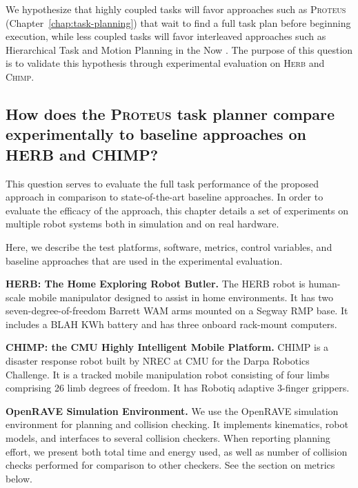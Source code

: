 {We hypothesize that highly coupled tasks will favor approaches
such as \textsc{Proteus} (Chapter~\ref{chap:task-planning})
that wait to find a full task plan
before beginning execution,
while less coupled tasks will favor interleaved approaches
such as Hierarchical Task and Motion Planning in the Now
\cite{kaelbling2011inthenow}.
The purpose of this question is to validate this hypothesis
through experimental evaluation on \textsc{Herb} and \textsc{Chimp}.

\subsection{How does the \textsc{Proteus} task planner
   compare experimentally to baseline approaches
   on \textsc{HERB} and \textsc{CHIMP}?}
\label{ques:proteus-compare}

This question serves to evaluate the full task performance of the
proposed approach
in comparison to state-of-the-art baseline approaches.
In order to evaluate the efficacy of the approach,
this chapter details a set of experiments on multiple robot systems
both in simulation and on real hardware.

Here, we describe the test platforms, software,
metrics, control variables,
and baseline approaches that are used in the experimental
evaluation.

\textbf{HERB: The Home Exploring Robot Butler.}
The HERB robot \cite{srinivasa2012herb20}
is human-scale mobile manipulator designed to assist in home
environments.
It has two seven-degree-of-freedom Barrett WAM arms mounted
on a Segway RMP base.
It includes a BLAH KWh battery and has three onboard rack-mount
computers.

\textbf{CHIMP: the CMU Highly Intelligent Mobile Platform.}
CHIMP \cite{stentz2014chimp}
is a disaster response robot built by NREC at CMU
for the Darpa Robotics Challenge.
It is a tracked mobile manipulation robot consisting of
four limbs comprising 26 limb degrees of freedom.
It has Robotiq adaptive 3-finger grippers.

\textbf{OpenRAVE Simulation Environment.}
We use the OpenRAVE \cite{diankov2010openrave} simulation environment
for planning and collision checking.
It implements kinematics, robot models,
and interfaces to several collision checkers.
When reporting planning effort,
we present both total time and energy used,
as well as number of collision checks performed
for comparison to other checkers.
See the section on metrics below.

}
